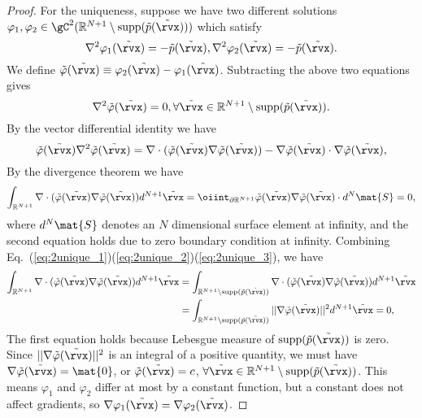 \begin{proof}
For the uniqueness, suppose we have two different solutions $\varphi_1,\varphi_2\in \gC^2(\mathbb{R}^{N+1} \setminus \textrm{supp}(\tilde{p}(\tilde{\rvx})))$ which satisfy 
\begin{equation}
    \nabla^2\varphi_1(\tilde{\rvx}) = -\tilde{p}(\tilde{\rvx}), \nabla^2\varphi_2(\tilde{\rvx}) = -\tilde{p}(\tilde{\rvx}).
\end{equation}
We define $\tilde{\varphi}(\tilde{\rvx})\equiv\varphi_2(\tilde{\rvx})-\varphi_1(\tilde{\rvx})$. Subtracting the above two equations gives
\begin{equation}\label{eq:2unique_1}
    \nabla^2\tilde{\varphi}(\tilde{\rvx}) = 0, \forall \tilde{\rvx} \in \mathbb{R}^{N+1} \setminus \textrm{supp}(\tilde{p}(\tilde{\rvx})).
\end{equation}
By the vector differential identity we have
\begin{equation}\label{eq:2unique_2}
    \tilde{\varphi}(\tilde{\rvx})\nabla^2\tilde{\varphi}(\tilde{\rvx}) = \nabla\cdot(\tilde{\varphi}(\tilde{\rvx})\nabla\tilde{\varphi}(\tilde{\rvx}))-\nabla\tilde{\varphi}(\tilde{\rvx})\cdot \nabla\tilde{\varphi}(\tilde{\rvx}),
\end{equation}
By the divergence theorem we have
\begin{equation}\label{eq:2unique_3}
    \int_{\mathbb{R}^{N+1}} \nabla\cdot(\tilde{\varphi}(\tilde{\rvx})\nabla\tilde{\varphi}(\tilde{\rvx})) d^{N+1}\tilde{\rvx} = \oiint_{\partial\mathbb{R}^{N+1}} \tilde{\varphi}(\tilde{\rvx})\nabla\tilde{\varphi}(\tilde{\rvx})\cdot d^{N}\mat{S} = 0,
\end{equation}
where $d^{N}\mat{S}$ denotes an $N$ dimensional surface element at infinity, and the second equation holds due to zero boundary condition at infinity. Combining Eq.~(\ref{eq:2unique_1})(\ref{eq:2unique_2})(\ref{eq:2unique_3}), we have
\begin{align*}
    \int_{\mathbb{R}^{N+1}} \nabla\cdot(\tilde{\varphi}(\tilde{\rvx})\nabla\tilde{\varphi}(\tilde{\rvx})) d^{N+1}\tilde{\rvx} &= \int_{\mathbb{R}^{N+1} \setminus \textrm{supp}(\tilde{p}(\tilde{\rvx}))} \nabla\cdot(\tilde{\varphi}(\tilde{\rvx})\nabla\tilde{\varphi}(\tilde{\rvx})) d^{N+1}\tilde{\rvx}\\
    &=\int_{\mathbb{R}^{N+1} \setminus \textrm{supp}(\tilde{p}(\tilde{\rvx}))} ||\nabla\tilde{\varphi}(\tilde{\rvx})||^2 d^{N+1}\tilde{\rvx}=0,
\end{align*}
The first equation holds because Lebesgue measure of $\textrm{supp}(\tilde{p}(\tilde{\rvx}))$ is zero. Since $||\nabla\tilde{\varphi}(\tilde{\rvx})||^2$ is an integral of a positive quantity, we must have $\nabla\tilde{\varphi}(\tilde{\rvx})=\mat{0}$, or $\tilde{\varphi}(\tilde{\rvx})=c$, $\forall\tilde{\rvx}\in\mathbb{R}^{N+1}\setminus \textrm{supp}(\tilde{p}(\tilde{\rvx}))$. This means $\varphi_1$ and $\varphi_2$ differ at most by a constant function, but a constant does not affect gradients, so $\nabla\varphi_1(\tilde{\rvx})=\nabla\varphi_2(\tilde{\rvx})$. \end{proof}


